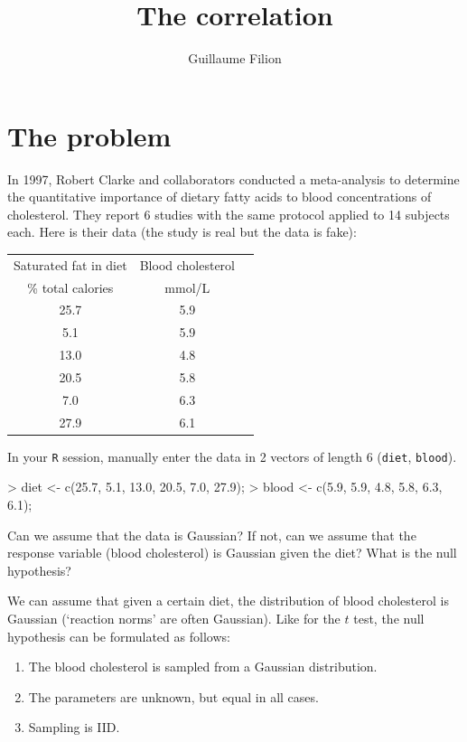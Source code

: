 \documentclass[a4paper]{article}
\title{The correlation}
\author{Guillaume Filion}
\theoremstyle{definition}
\begin{document}
\maketitle


\section{The problem}

In 1997, Robert Clarke and collaborators conducted a meta-analysis to
determine the quantitative importance of dietary fatty acids to blood
concentrations of cholesterol. They report 6 studies with the same protocol
applied to 14 subjects each. Here is their data (the study is real but
the data is fake):

\begin{center}
  \par
  \begin{tabular}{ccc}
    Saturated fat in diet & Blood cholesterol \\
    \% total calories     & mmol/L \\
    \hline
    25.7 & 5.9 \\
    5.1 & 5.9 \\
    13.0 & 4.8 \\
    20.5 & 5.8 \\
    7.0 & 6.3 \\
    27.9 & 6.1
  \end{tabular}
\end{center}

In your \texttt{R} session, manually enter the data in 2 vectors of
length 6 (\texttt{diet}, \texttt{blood}).

\begin{Schunk}
\begin{Sinput}
> diet <- c(25.7, 5.1, 13.0, 20.5, 7.0, 27.9);
> blood <- c(5.9, 5.9, 4.8, 5.8, 6.3, 6.1);
\end{Sinput}
\end{Schunk}

\begin{Exercise}
Can we assume that the data is Gaussian? If not, can we assume that the
response variable (blood cholesterol) is Gaussian given the diet?
What is the null hypothesis?
\end{Exercise}
\begin{Answer}
We can assume that given a certain diet, the distribution of blood
cholesterol is Gaussian (`reaction norms' are often Gaussian).
Like for the $t$ test, the null hypothesis can be formulated as follows:
\begin{enumerate}
\item
The blood cholesterol is sampled from a Gaussian distribution.
\item
\label{reject}
The parameters are unknown, but equal in all cases.
\item
Sampling is IID.
\end{enumerate}
\end{Answer}
\end{document}
